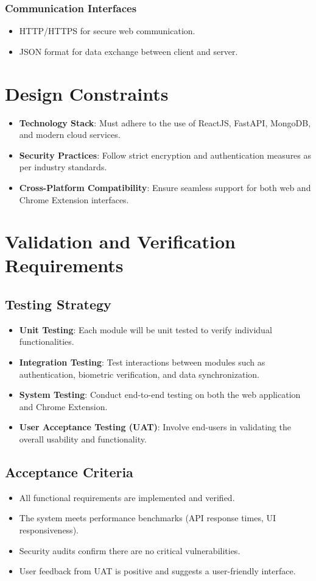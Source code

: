 \documentclass{scrreprt}
\begin{document}
\subsection{Communication Interfaces}
\begin{itemize}
    \item HTTP/HTTPS for secure web communication.
    \item JSON format for data exchange between client and server.
\end{itemize}

\chapter{Design Constraints}
\begin{itemize}
    \item \textbf{Technology Stack}: Must adhere to the use of ReactJS, FastAPI, MongoDB, and modern cloud services.
    \item \textbf{Security Practices}: Follow strict encryption and authentication measures as per industry standards.
    \item \textbf{Cross-Platform Compatibility}: Ensure seamless support for both web and Chrome Extension interfaces.
\end{itemize}

\chapter{Validation and Verification Requirements}
\section{Testing Strategy}
\begin{itemize}
    \item \textbf{Unit Testing}: Each module will be unit tested to verify individual functionalities.
    \item \textbf{Integration Testing}: Test interactions between modules such as authentication, biometric verification, and data synchronization.
    \item \textbf{System Testing}: Conduct end-to-end testing on both the web application and Chrome Extension.
    \item \textbf{User Acceptance Testing (UAT)}: Involve end-users in validating the overall usability and functionality.
\end{itemize}

\section{Acceptance Criteria}
\begin{itemize}
    \item All functional requirements are implemented and verified.
    \item The system meets performance benchmarks (API response times, UI responsiveness).
    \item Security audits confirm there are no critical vulnerabilities.
    \item User feedback from UAT is positive and suggests a user-friendly interface.
\end{itemize}
\end{document}
